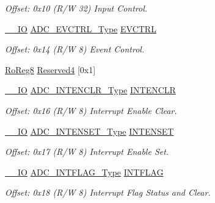 \begin{DoxyCompactItemize}
\begin{DoxyCompactList}\small\item\em Offset\+: 0x10 (R/W 32) Input Control. \end{DoxyCompactList}\item 
\mbox{\hyperlink{core__cm0plus_8h_aec43007d9998a0a0e01faede4133d6be}{\+\_\+\+\_\+\+IO}} \mbox{\hyperlink{union_a_d_c___e_v_c_t_r_l___type}{A\+D\+C\+\_\+\+E\+V\+C\+T\+R\+L\+\_\+\+Type}} \mbox{\hyperlink{struct_adc_abe8bcddd50786fcd2670fd8e60ca2f85}{E\+V\+C\+T\+RL}}
\begin{DoxyCompactList}\small\item\em Offset\+: 0x14 (R/W 8) Event Control. \end{DoxyCompactList}\item 
\mbox{\hyperlink{group___s_a_m_d21_e15_a__definitions_ga0d957f1433aaf5d70e4dc2b68288442d}{Ro\+Reg8}} \mbox{\hyperlink{struct_adc_a5ca570382e961b7801aeafc161de2571}{Reserved4}} \mbox{[}0x1\mbox{]}
\item 
\mbox{\hyperlink{core__cm0plus_8h_aec43007d9998a0a0e01faede4133d6be}{\+\_\+\+\_\+\+IO}} \mbox{\hyperlink{union_a_d_c___i_n_t_e_n_c_l_r___type}{A\+D\+C\+\_\+\+I\+N\+T\+E\+N\+C\+L\+R\+\_\+\+Type}} \mbox{\hyperlink{struct_adc_ae5329d06e9488447c6d1b5483bc23adf}{I\+N\+T\+E\+N\+C\+LR}}
\begin{DoxyCompactList}\small\item\em Offset\+: 0x16 (R/W 8) Interrupt Enable Clear. \end{DoxyCompactList}\item 
\mbox{\hyperlink{core__cm0plus_8h_aec43007d9998a0a0e01faede4133d6be}{\+\_\+\+\_\+\+IO}} \mbox{\hyperlink{union_a_d_c___i_n_t_e_n_s_e_t___type}{A\+D\+C\+\_\+\+I\+N\+T\+E\+N\+S\+E\+T\+\_\+\+Type}} \mbox{\hyperlink{struct_adc_a8fb7d4296ddd8c0f80dad362e6b7b7a2}{I\+N\+T\+E\+N\+S\+ET}}
\begin{DoxyCompactList}\small\item\em Offset\+: 0x17 (R/W 8) Interrupt Enable Set. \end{DoxyCompactList}\item 
\mbox{\hyperlink{core__cm0plus_8h_aec43007d9998a0a0e01faede4133d6be}{\+\_\+\+\_\+\+IO}} \mbox{\hyperlink{union_a_d_c___i_n_t_f_l_a_g___type}{A\+D\+C\+\_\+\+I\+N\+T\+F\+L\+A\+G\+\_\+\+Type}} \mbox{\hyperlink{struct_adc_a136020ff8e9f992bd4d76e268c5d8b73}{I\+N\+T\+F\+L\+AG}}
\begin{DoxyCompactList}\small\item\em Offset\+: 0x18 (R/W 8) Interrupt Flag Status and Clear. \end{DoxyCompactList}\item 

\end{DoxyCompactItemize}
